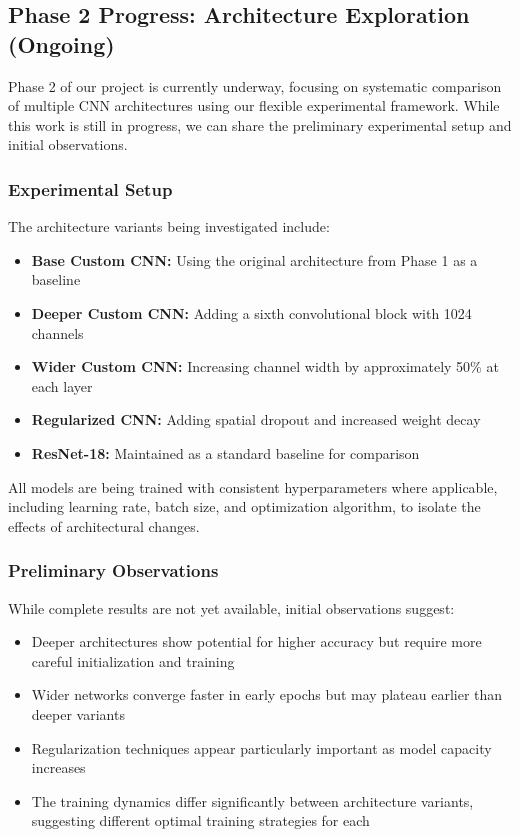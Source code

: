 \subsection{Phase 2 Progress: Architecture Exploration (Ongoing)}
Phase 2 of our project is currently underway, focusing on systematic comparison of multiple CNN architectures using our flexible experimental framework. While this work is still in progress, we can share the preliminary experimental setup and initial observations.

\subsubsection{Experimental Setup}
The architecture variants being investigated include:
\begin{itemize}
    \item \textbf{Base Custom CNN:} Using the original architecture from Phase 1 as a baseline
    \item \textbf{Deeper Custom CNN:} Adding a sixth convolutional block with 1024 channels
    \item \textbf{Wider Custom CNN:} Increasing channel width by approximately 50\% at each layer
    \item \textbf{Regularized CNN:} Adding spatial dropout and increased weight decay
    \item \textbf{ResNet-18:} Maintained as a standard baseline for comparison
\end{itemize}

All models are being trained with consistent hyperparameters where applicable, including learning rate, batch size, and optimization algorithm, to isolate the effects of architectural changes.


\subsubsection{Preliminary Observations}
While complete results are not yet available, initial observations suggest:
\begin{itemize}
    \item Deeper architectures show potential for higher accuracy but require more careful initialization and training
    \item Wider networks converge faster in early epochs but may plateau earlier than deeper variants
    \item Regularization techniques appear particularly important as model capacity increases
    \item The training dynamics differ significantly between architecture variants, suggesting different optimal training strategies for each
\end{itemize}

